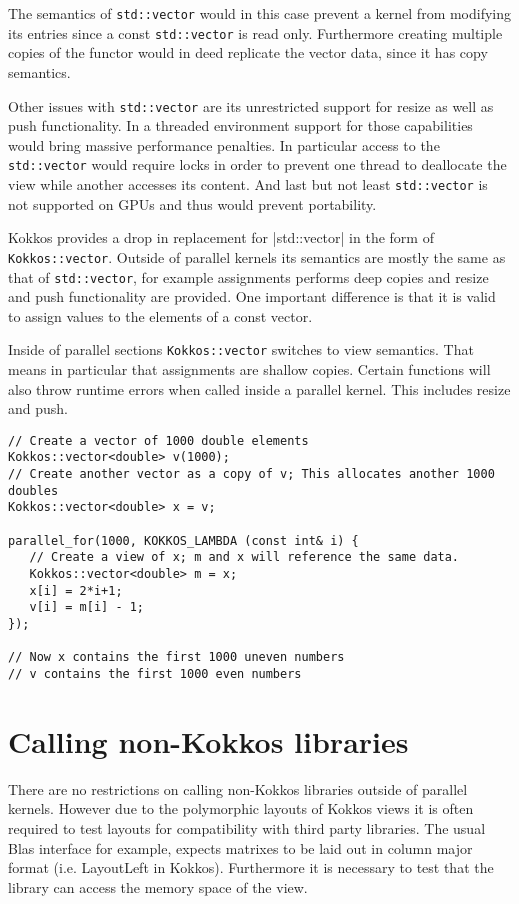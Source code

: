 The semantics of \lstinline|std::vector| would in this case prevent a kernel from modifying its 
entries since a const \lstinline|std::vector| is read only. Furthermore creating multiple copies
of the functor would in deed replicate the vector data, since it has copy semantics.

Other issues with \lstinline|std::vector| are its unrestricted support for resize as well as push 
functionality. In a threaded environment support for those capabilities would bring
massive performance penalties. In particular access to the \lstinline|std::vector| would require
locks in order to prevent one thread to deallocate the view while another accesses its content.
And last but not least \lstinline|std::vector| is not supported on GPUs and thus would prevent
portability. 
 
Kokkos provides a drop in replacement for |std::vector| in the form of \lstinline|Kokkos::vector|.
Outside of parallel kernels its semantics are mostly the same as that of \lstinline|std::vector|, for
example assignments performs deep copies and resize and push functionality are provided.
One important difference is that it is valid to assign values to the elements of a const vector.

Inside of parallel sections \lstinline|Kokkos::vector| switches to view semantics. That means
in particular that assignments are shallow copies. Certain functions will also throw runtime 
errors when called inside a parallel kernel. This includes resize and push. 

\begin{lstlisting}
// Create a vector of 1000 double elements
Kokkos::vector<double> v(1000);
// Create another vector as a copy of v; This allocates another 1000 doubles
Kokkos::vector<double> x = v; 

parallel_for(1000, KOKKOS_LAMBDA (const int& i) {
   // Create a view of x; m and x will reference the same data.
   Kokkos::vector<double> m = x; 
   x[i] = 2*i+1;
   v[i] = m[i] - 1;
});

// Now x contains the first 1000 uneven numbers
// v contains the first 1000 even numbers
\end{lstlisting}

\section{Calling non-Kokkos libraries}

There are no restrictions on calling non-Kokkos libraries outside of parallel kernels. 
However due to the polymorphic layouts of Kokkos views it is often required to test
layouts for compatibility with third party libraries. The usual Blas interface for example,
expects matrixes to be laid out in column major format (i.e. LayoutLeft in Kokkos). 
Furthermore it is necessary to test that the library can access the memory space 
of the view.

